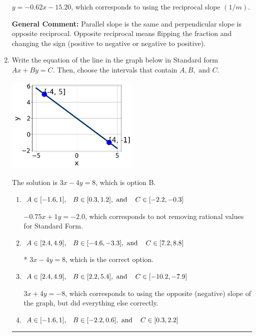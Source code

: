 \documentclass{extbook}[14pt]
\newcommand{\litem}[1]{\item #1

\rule{\textwidth}{0.4pt}}
\begin{document}
\begin{enumerate}
{\begin{enumerate}[label=\Alph*.]
 $y = -0.62x - 15.20$, which corresponds to using the reciprocal slope $(1/m)$.
\end{enumerate}

\textbf{General Comment:} Parallel slope is the same and perpendicular slope is opposite reciprocal. Opposite reciprocal means flipping the fraction and changing the sign (positive to negative or negative to positive).
}
\litem{
Write the equation of the line in the graph below in Standard form $Ax+By=C$. Then, choose the intervals that contain $A, B, \text{ and } C$.

\begin{center}
    \includegraphics[width=0.5\textwidth]{../Figures/linearGraphToStandardCopyA.png}
\end{center}



The solution is \( 3x - 4y = 8 \), which is option B.\begin{enumerate}[label=\Alph*.]
\item \( A \in [-1.6, 1], \hspace{3mm} B \in [0.3, 1.2], \text{ and } \hspace{3mm} C \in [-2.2, -0.3] \)

 $-0.75x + 1y = -2.0$, which corresponds to not removing rational values for Standard Form.
\item \( A \in [2.4, 4.9], \hspace{3mm} B \in [-4.6, -3.3], \text{ and } \hspace{3mm} C \in [7.2, 8.8] \)

* $3x - 4y = 8$, which is the correct option.
\item \( A \in [2.4, 4.9], \hspace{3mm} B \in [2.2, 5.4], \text{ and } \hspace{3mm} C \in [-10.2, -7.9] \)

 $3x + 4y = -8$, which corresponds to using the opposite (negative) slope of the graph, but did everything else correctly.
\item \( A \in [-1.6, 1], \hspace{3mm} B \in [-2.2, 0.6], \text{ and } \hspace{3mm} C \in [0.3, 2.2] \)


\end{enumerate}}
\end{enumerate}
\end{document}
